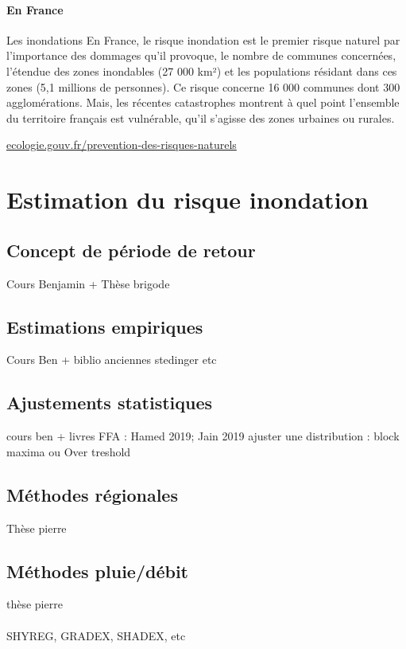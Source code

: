 \documentclass[11pt]{article}
\begin{document}
	
	\paragraph{En France}
	
	Les inondations 
En France, le risque inondation est le premier risque naturel par l’importance des dommages qu’il provoque, le nombre de communes concernées, l’étendue des zones inondables (27 000 km²) et les populations résidant dans ces zones (5,1 millions de personnes). Ce risque concerne 16 000 communes dont 300 agglomérations. Mais, les récentes catastrophes montrent à quel point l’ensemble du territoire français est vulnérable, qu’il s’agisse des zones urbaines ou rurales.

\url{ecologie.gouv.fr/prevention-des-risques-naturels}



\section{Estimation du risque inondation}
		\subsection{Concept de période de retour}
		Cours Benjamin + Thèse brigode 
		
	    \subsection{Estimations empiriques}
	    Cours Ben + biblio anciennes stedinger etc
	    \subsection{Ajustements statistiques}
	    cours ben + livres FFA : Hamed 2019; Jain 2019
	    ajuster une distribution : block maxima ou Over treshold
	    \subsection{Méthodes régionales}
	    Thèse pierre
	    \subsection{Méthodes pluie/débit}
	    thèse pierre
	    \paragraph{} SHYREG, GRADEX, SHADEX, etc
	    
\end{document}
